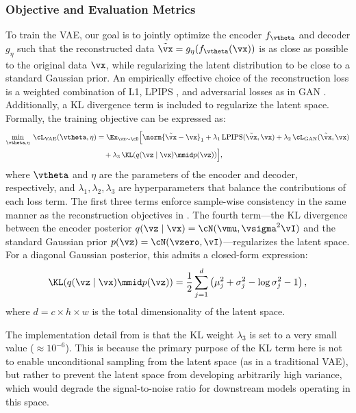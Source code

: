 \documentclass[../../book-main.tex]{subfiles}
\begin{document}
\subsubsection{Objective and Evaluation Metrics}
To train the VAE, our goal is to jointly optimize the encoder \(f_{\vtheta}\) and decoder \(g_{\eta}\) such that the reconstructed data \(\tilde{\vx} = g_{\eta}(f_{\vtheta}(\vx))\) is as close as possible to the original data \(\vx\), while regularizing the latent distribution to be close to a standard Gaussian prior.
An empirically effective choice of the reconstruction loss is a weighted combination of L1, LPIPS \citep{zhang2018unreasonable}, and adversarial losses as in GAN \citep{goodfellow2014generative}.
Additionally, a KL divergence term is included to regularize the latent space.
Formally, the training objective can be expressed as:
\begin{equation}
\begin{aligned}
\min_{\vtheta, \eta} \;
\cL_{\text{VAE}}(\vtheta, \eta) &= \Ex_{\vx \sim \cD} \Big[
    \norm{\tilde{\vx} - \vx}_1 + \lambda_1 \, \mathrm{LPIPS}(\tilde{\vx}, \vx) + \lambda_2 \, \cL_{\text{GAN}}(\tilde{\vx}, \vx) \\
    &\quad + \lambda_3 \, \KL(q(\vz \mid \vx) \mmid p(\vz))
\Big] ,
\end{aligned}
\label{eq:vae_loss}
\end{equation}
where \(\vtheta\) and \(\eta\) are the parameters of the encoder and decoder, respectively, and \(\lambda_1, \lambda_2, \lambda_3\) are hyperparameters that balance the contributions of each loss term.
The first three terms enforce sample-wise consistency in the same manner as the reconstruction objectives in .
The fourth term---the KL divergence between the encoder posterior \(q(\vz \mid \vx) = \cN(\vmu, \vsigma^2 \vI)\) and the standard Gaussian prior \(p(\vz) = \cN(\vzero, \vI)\)---regularizes the latent space.
For a diagonal Gaussian posterior, this admits a closed-form expression:
\begin{equation}
    \KL(q(\vz \mid \vx) \mmid p(\vz)) = \frac{1}{2} \sum_{j=1}^{d} \left( \mu_j^2 + \sigma_j^2 - \log \sigma_j^2 - 1 \right) ,
\end{equation}
where \(d = c \times h \times w\) is the total dimensionality of the latent space.

The implementation detail from \citet{rombach2022high} is that the KL weight \(\lambda_3\) is set to a very small value (\(\approx 10^{-6}\)).
This is because the primary purpose of the KL term here is not to enable unconditional sampling from the latent space (as in a traditional VAE), but rather to prevent the latent space from developing arbitrarily high variance, which would degrade the signal-to-noise ratio for downstream models operating in this space.
\end{document}
